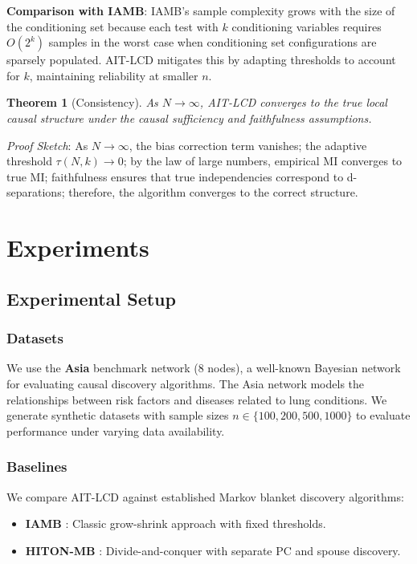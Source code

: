 \documentclass{article}
\theoremstyle{plain}
\newtheorem{theorem}{Theorem}
\theoremstyle{definition}
\begin{document}
\textbf{Comparison with IAMB}: IAMB's sample complexity grows with the size of the conditioning set because each test with $k$ conditioning variables requires $O(2^k)$ samples in the worst case when conditioning set configurations are sparsely populated. AIT-LCD mitigates this by adapting thresholds to account for $k$, maintaining reliability at smaller $n$.

\begin{theorem}[Consistency]\label{thm:consistency}
As $N \rightarrow \infty$, AIT-LCD converges to the true local causal structure under the causal sufficiency and faithfulness assumptions.
\end{theorem}

\textit{Proof Sketch}: As $N \rightarrow \infty$, the bias correction term vanishes; the adaptive threshold $\tau(N, k) \rightarrow 0$; by the law of large numbers, empirical MI converges to true MI; faithfulness ensures that true independencies correspond to d-separations; therefore, the algorithm converges to the correct structure.

\section{Experiments}\label{sec:experiments}

\subsection{Experimental Setup}

\subsubsection{Datasets}

We use the \textbf{Asia} benchmark network (8 nodes), a well-known Bayesian network for evaluating causal discovery algorithms. The Asia network models the relationships between risk factors and diseases related to lung conditions. We generate synthetic datasets with sample sizes $n \in \{100, 200, 500, 1000\}$ to evaluate performance under varying data availability.

\subsubsection{Baselines}

We compare AIT-LCD against established Markov blanket discovery algorithms:
\begin{itemize}
    \item \textbf{IAMB} \citep{tsamardinos2003algorithms}: Classic grow-shrink approach with fixed thresholds.
    \item \textbf{HITON-MB} \citep{aliferis2003hiton}: Divide-and-conquer with separate PC and spouse discovery.
\end{itemize}
\end{document}
